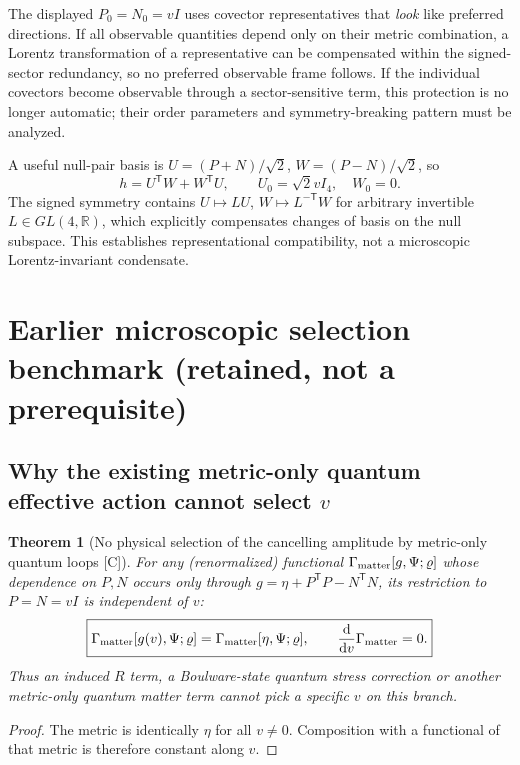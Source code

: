 \documentclass[11pt,a4paper]{article}
\newtheorem{theorem}{Theorem}[section]
\theoremstyle{definition}\newtheorem{definition}[theorem]{Definition}
\theoremstyle{remark}\newtheorem{remark}[theorem]{Remark}
\newcommand{\Ctag}{\textsf{[C]}}
\newcommand{\dd}{\mathrm d}
\begin{document}
The displayed $P_0=N_0=vI$ uses covector representatives that \emph{look} like preferred directions. If all observable quantities depend only on their metric combination, a Lorentz transformation of a representative can be compensated within the signed-sector redundancy, so no preferred observable frame follows. If the individual covectors become observable through a sector-sensitive term, this protection is no longer automatic; their order parameters and symmetry-breaking pattern must be analyzed.

A useful null-pair basis is $U=(P+N)/\sqrt2$, $W=(P-N)/\sqrt2$, so
\begin{equation}
 h=U^{\mathsf T}W+W^{\mathsf T}U,\qquad U_0=\sqrt2vI_4,\quad W_0=0.
\end{equation}
The signed symmetry contains $U\mapsto L U$, $W\mapsto L^{-\mathsf T}W$ for arbitrary invertible $L\in GL(4,\mathbb R)$, which explicitly compensates changes of basis on the null subspace. This establishes representational compatibility, not a microscopic Lorentz-invariant condensate.

\section{Earlier microscopic selection benchmark (retained, not a prerequisite)}
\subsection{Why the existing metric-only quantum effective action cannot select $v$}
\begin{theorem}[No physical selection of the cancelling amplitude by metric-only quantum loops \Ctag]\label{thm:noselect}
For any (renormalized) functional $\Gamma_{\rm matter}[g,\Psi;\varrho]$ whose dependence on $P,N$ occurs only through $g=\eta+P^{\mathsf T}P-N^{\mathsf T}N$, its restriction to $P=N=vI$ is independent of $v$:
\begin{equation}\label{eq:noselect}
\boxed{\Gamma_{\rm matter}[g(v),\Psi;\varrho]=\Gamma_{\rm matter}[\eta,\Psi;\varrho],\qquad \frac{\dd}{\dd v}\Gamma_{\rm matter}=0.}
\end{equation}
Thus an induced $R$ term, a Boulware-state quantum stress correction or another metric-only quantum matter term cannot pick a specific $v$ on this branch.
\end{theorem}
\begin{proof} The metric is identically $\eta$ for all $v\ne0$. Composition with a functional of that metric is therefore constant along $v$.\end{proof}
\end{document}

